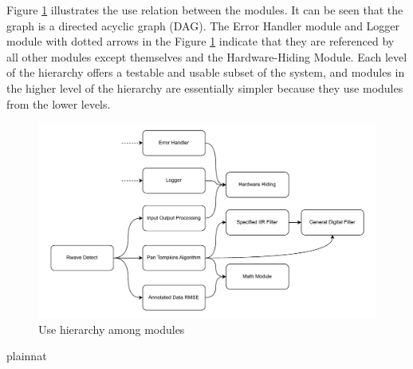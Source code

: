 \documentclass[12pt, titlepage]{article}
\begin{document}
Figure \ref{FigUH} illustrates the use relation between the modules. It can be
seen that the graph is a directed acyclic graph (DAG).  The Error Handler module
and Logger module with dotted arrows in the Figure \ref{FigUH} indicate that
they are referenced by all other modules except themselves and the
Hardware-Hiding Module.  Each level of the hierarchy offers a testable and
usable subset of the system, and modules in the higher level of the hierarchy
are essentially simpler because they use modules from the lower levels.


\begin{figure}[H]
\centering
\includegraphics[width=1.1\textwidth]{UsesHierarchy.pdf}
\caption{Use hierarchy among modules}
\label{FigUH}
\end{figure}




 {plainnat}


\newpage{}
\end{document}
